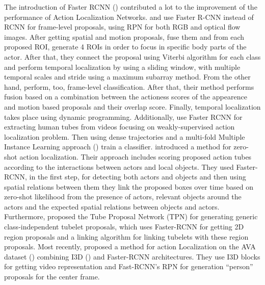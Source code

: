 The introduction of Faster RCNN (\cite{Ren:2015:FRT:2969239.2969250}) contributed a lot to the improvement of the performance of Action Localization Networks.
\cite{peng:hal-01349107} and \cite{DBLP:journals/corr/SahaSSTC16}   use Faster R-CNN  instead of RCNN
for frame-level proposals, using RPN for both RGB and optical flow images.
After getting spatial and motion proposals, \cite{peng:hal-01349107} fuse them  and from each proposed ROI, generate 4 ROIs in order to focus in specific
body parts of the actor. After that, they connect the proposal using Viterbi algorithm for each class and perform temporal localization by using a sliding window, with multiple
temporal scales and stride using a maximum subarray method. From the other hand, \cite{DBLP:journals/corr/SahaSSTC16} perform, too, frame-level classification. After that,
their method performs fusion based on a combination between the actioness scores of the appearence and motion based proposals and their overlap score. Finally, temporal localization
takes place using dynamic programming. Αdditionally, \cite{DBLP:journals/corr/WeinzaepfelMS16} use
Faster RCNN for extracting human tubes from videos focusing  on weakly-supervised action localization problem.
Then using dense trajectories and a  multi-fold Multiple  Instance  Learning approach (\cite{7420739}) train a classifier.
\cite{DBLP:journals/corr/MettesS17} introduced a method for zero-shot action localization. Their approach includes scoring proposed action tubes according to the interactions between
actors and local objects. They used Faster-RCNN, in the first step, for detecting both actors and objects and then using spatial relations between them they link the proposed boxes over
time based on zero-shot likelihood from the presence of actors, relevant objects around the actors and the expected spatial relations between objects and actors.
Furthermore, \cite{DBLP:journals/corr/HeIDM17} proposed the Tube Proposal Network (TPN) for generating generic class-independent tubelet proposals, which uses Faster-RCNN for getting
2D region proposals and a linking algorithm for linking tubelets with these region proposals. Most recently, \cite{DBLP:journals/corr/abs-1807-10066} proposed a method for action Localization
on the AVA dataset (\cite{DBLP:journals/corr/GuSVPRTLRSSM17}) combining I3D (\cite{DBLP:journals/corr/CarreiraZ17}) and Faster-RCNN architectures. They use I3D blocks for getting video representation
and Fast-RCNN's RPN for generation ``person'' proposals for the center frame.
\par

